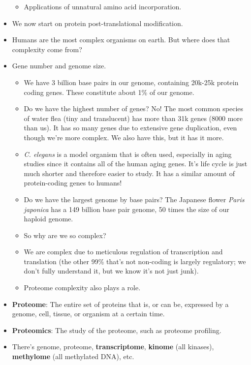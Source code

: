 \documentclass[../notes.tex]{subfiles}
\begin{document}
\begin{itemize}
\begin{itemize}
\begin{itemize}
        \end{itemize}
        \item Applications of unnatural amino acid incorporation.
    \end{itemize}
    \item We now start on protein post-translational modification.
    \item Humans are the most complex organisms on earth. But where does that complexity come from?
    \item Gene number and genome size.
    \begin{itemize}
        \item We have 3 billion base pairs in our genome, containing 20k-25k protein coding genes. These constitute about 1\% of our genome.
        \item Do we have the highest number of genes? No! The most common species of water flea (tiny and translucent) has more than 31k genes (8000 more than us). It has so many genes due to extensive gene duplication, even though we're more complex. We also have this, but it has it more.
        \item \emph{C. elegans} is a model organism that is often used, especially in aging studies since it contains all of the human aging genes. It's life cycle is just much shorter and therefore easier to study. It has a similar amount of protein-coding genes to humans!
        \item Do we have the largest genome by base pairs? The Japanese flower \emph{Paris japonica} has a 149 billion base pair genome, 50 times the size of our haploid genome.
        \item So why are we so complex?
        \item We are complex due to meticulous regulation of transcription and translation (the other 99\% that's not non-coding is largely regulatory; we don't fully understand it, but we know it's not just junk).
        \item Proteome complexity also plays a role.
    \end{itemize}
    \item \textbf{Proteome}: The entire set of proteins that is, or can be, expressed by a genome, cell, tissue, or organism at a certain time.
    \item \textbf{Proteomics}: The study of the proteome, such as proteome profiling.
    \item There's genome, proteome, \textbf{transcriptome}, \textbf{kinome} (all kinases), \textbf{methylome} (all methylated DNA), etc.

\end{itemize}
\end{document}
